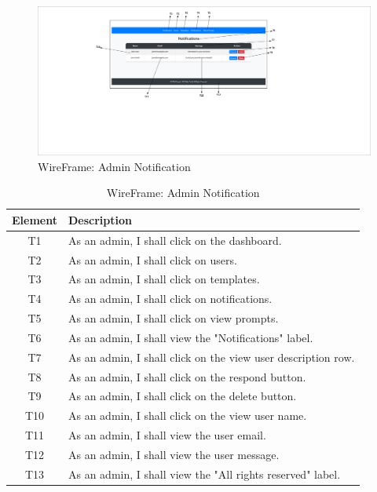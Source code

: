 \documentclass[12pt]{report}
\begin{document}
\begin{figure}[ht]
    \centering
    \includegraphics[width=1\textwidth, trim=10cm 9cm 14cm 0cm, clip]{Media/3.pdf} %
    \caption{WireFrame: Admin Notification}
    \label{fig:drawing1}
\end{figure}
\begin{table}[h!]
    \centering
    \begin{tabular}{|c|p{10cm}|}
        \hline
        \textbf{Element} & \textbf{Description} \\
        \hline
        T1 & As an admin, I shall click on the dashboard. \\
        \hline
        T2 & As an admin, I shall click on users. \\
        \hline
        T3 & As an admin, I shall click on templates. \\
        \hline
        T4 & As an admin, I shall click on notifications. \\
        \hline
        T5 & As an admin, I shall click on view prompts. \\
        \hline
        T6 & As an admin, I shall view the "Notifications" label. \\
        \hline
        T7 & As an admin, I shall click on the view user description row. \\
        \hline
        T8 & As an admin, I shall click on the respond button. \\
        \hline
        T9 & As an admin, I shall click on the delete button. \\
        \hline
        T10 & As an admin, I shall click on the view user name. \\
        \hline
        T11 & As an admin, I shall view the user email. \\
        \hline
        T12 & As an admin, I shall view the user message. \\
        \hline
        T13 & As an admin, I shall view the "All rights reserved" label. \\
        \hline
    \end{tabular}
    \caption{WireFrame: Admin Notification}
    \label{tab:admin_user_management_actions}
\end{table}
\end{document}
